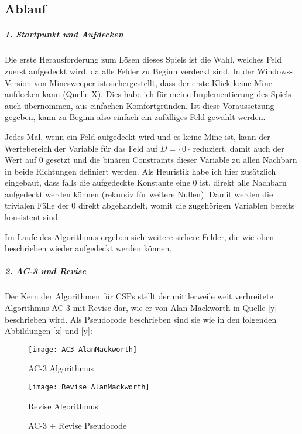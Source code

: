 \subsection*{Ablauf}
\subparagraph{1. Startpunkt und Aufdecken}

Die erste Herausforderung zum Lösen dieses Spiels ist die Wahl, welches Feld zuerst aufgedeckt wird, da alle Felder zu Beginn verdeckt sind.
In der Windows-Version von Minesweeper ist sichergestellt, dass der erste Klick keine Mine aufdecken kann (Quelle X). Dies habe ich für 
meine Implementierung des Spiels auch übernommen, aus einfachen Komfortgründen. Ist diese Voraussetzung gegeben, kann zu Beginn also einfach
ein zufälliges Feld gewählt werden.

Jedes Mal, wenn ein Feld aufgedeckt wird und es keine Mine ist, kann der Wertebereich der Variable für
das Feld auf $D=\{0\}$ reduziert, damit auch der Wert auf 0 gesetzt und die binären Constraints dieser Variable zu allen Nachbarn in beide
Richtungen definiert werden. Als Heuristik habe ich hier zusätzlich eingebaut, dass falls die aufgedeckte Konstante eine 0 ist, direkt
alle Nachbarn aufgedeckt werden können (rekursiv für weitere Nullen). Damit werden die trivialen Fälle der 0 direkt abgehandelt, womit
die zugehörigen Variablen bereits konsistent sind.

Im Laufe des Algorithmus ergeben sich weitere sichere Felder, die wie oben beschrieben wieder aufgedeckt werden können.

\subparagraph{2. AC-3 und Revise}

Der Kern der Algorithmen für CSPs stellt der mittlerweile weit verbreitete Algorithmus AC-3 mit Revise dar, wie er von Alan Mackworth in 
Quelle [y] beschrieben wird. Als Pseudocode beschrieben sind sie wie in den folgenden Abbildungen [x] und [y]:
\begin{figure}
    \centering
    \begin{subcaptionblock}{.4\textwidth}
    \centering
    \texttt{[image: AC3-AlanMackworth]}
    \caption{AC-3 Algorithmus}\label{cat}
    \end{subcaptionblock}%
    \begin{subcaptionblock}{.4\textwidth}
    \centering
    \texttt{[image: Revise\_AlanMackworth]}
    \caption{Revise Algorithmus}\label{elephant}
    \end{subcaptionblock}%
    \caption{AC-3 + Revise Pseudocode}\label{animals}
\end{figure}

